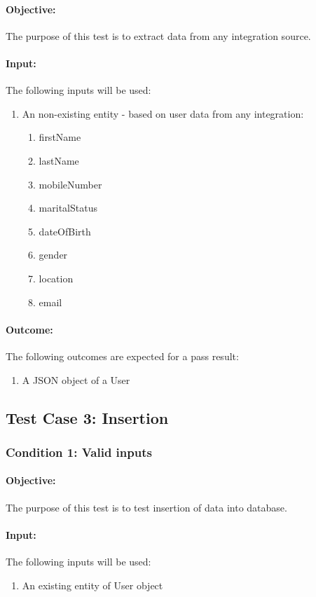 \documentclass{article}
\begin{document}
\paragraph{Objective:} The purpose of this test is to extract data from any integration source.
\paragraph{Input:} The following inputs will be used:
\begin{enumerate}
	\item An non-existing entity - based on user data from any integration:
	\begin{enumerate}
		\item firstName
  		\item lastName
  		\item mobileNumber 
  		\item maritalStatus 
  		\item dateOfBirth 
 		\item gender
  		\item location 
 		\item email	
	\end{enumerate}
\end{enumerate}
\paragraph{Outcome:} The following outcomes are expected for a pass result:
\begin{enumerate}
	\item A JSON object of a User 
\end{enumerate}

\subsection{Test Case 3: Insertion}\label{test3}
\subsubsection{Condition 1: Valid inputs }
\paragraph{Objective:} The purpose of this test is to test insertion of data into database.
\paragraph{Input:} The following inputs will be used:
\begin{enumerate}
	\item An existing entity of User object
\end{enumerate}
\end{document}
